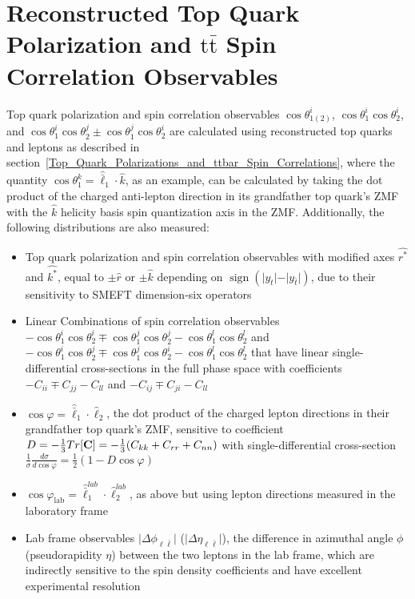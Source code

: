 \section{Reconstructed Top Quark Polarization and \ensuremath{\mathrm{t\bar{t}}} Spin Correlation Observables}
\label{Reconstructed_Polarization_Spin_Correlation_Observables}
Top quark polarization and \ttbar spin correlation observables $\cos\theta_{1(2)}^i$, $\cos \theta_1^i \cos \theta_2^i$, and $\cos \theta_1^i \cos \theta_2^j \pm \cos \theta_1^j \cos \theta_2^i$ are calculated using reconstructed top quarks and leptons as described in section~\ref{Top_Quark_Polarizations_and_ttbar_Spin_Correlations}, where the quantity $\cos \theta_1^k = \hat{\bar{\ell}}_1 \cdot \hat{k}$, as an example, can be calculated by taking the dot product of the charged anti-lepton direction in its grandfather top quark's ZMF with the $\hat{k}$ helicity basis spin quantization axis in the \ttbar ZMF.
Additionally, the following distributions are also measured:
\begin{itemize}
    \item Top quark polarization and \ttbar spin correlation observables with modified axes $\hat{r^*}$ and $\hat{k^*}$, equal to $\pm \hat{r}$ or $\pm \hat{k}$ depending on $\operatorname{sign}(\vert y_t \vert-\vert y_{\bar{t}} \vert)$, due to their sensitivity to SMEFT dimension-six operators
    \item Linear Combinations of spin correlation observables $-\cos \theta_1^i \cos \theta_2^i \mp \cos \theta_1^j \cos \theta_2^j - \cos \theta_1^l \cos \theta_2^l$ and $-\cos \theta_1^i \cos \theta_2^j \mp \cos \theta_1^j \cos \theta_2^i - \cos \theta_1^l \cos \theta_2^l$ that have linear single-differential cross-sections in the full phase space with coefficients $-C_{ii} \mp C_{jj} - C_{ll}$ and $-C_{ij} \mp C_{ji} - C_{ll}$
    \item  $\cos\varphi=\hat{\bar{\ell}}_{1} \cdot \hat{\ell}_2$, the dot product of the charged lepton directions in their grandfather top quark's ZMF, sensitive to coefficient $D = -\frac{1}{3}Tr[\mathbf{C}] = -\frac{1}{3}(C_{kk} + C_{rr} + C_{nn})$ with single-differential cross-section $\tfrac{1}{\sigma}\tfrac{d\sigma}{d\cos\varphi} = \tfrac{1}{2}(1-D\cos\varphi)$
    \item $\cos\varphi_{\mathrm{lab}}=\hat{\bar{\ell}}^{lab}_1 \cdot \hat{\ell}^{lab}_2$, as above but using lepton directions measured in the laboratory frame
    \item Lab frame observables $\vert \Delta\phi_{\ell\bar{\ell}} \vert$ ($\vert \Delta\eta_{\ell\bar{\ell}} \vert$), the difference in azimuthal angle $\phi$ (pseudorapidity $\eta$) between the two leptons in the lab frame, which are indirectly sensitive to the spin density coefficients and have excellent experimental resolution
\end{itemize}
